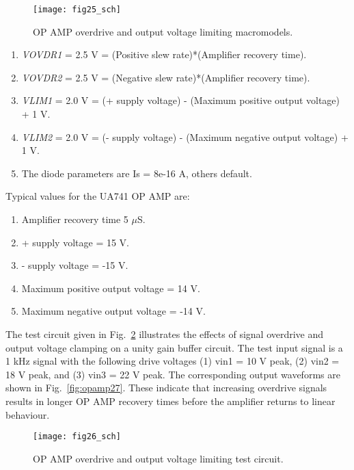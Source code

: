\begin{figure}
  \centering
  \texttt{[image: fig25\_sch]}
  \caption{OP AMP overdrive and output voltage limiting macromodels.}
  \label{fig:opamp25}
\end{figure}

\begin{enumerate}
\item \textit{VOVDR1} = 2.5 V = (Positive slew rate)*(Amplifier recovery time).
\item \textit{VOVDR2} = 2.5 V = (Negative slew rate)*(Amplifier recovery time).
\item \textit{VLIM1}  = 2.0 V = (+ supply voltage) - (Maximum positive output voltage) + 1 V.
\item \textit{VLIM2}  = 2.0 V = (- supply voltage) - (Maximum negative output voltage) + 1 V.
\item The diode parameters are Is = 8e-16 A, others default.
\end{enumerate}

Typical values for the UA741 OP AMP are:
\begin{enumerate}
\item Amplifier recovery time 5 $\mu$S.
\item + supply voltage =  15 V.
\item - supply voltage = -15 V.
\item Maximum positive output voltage =  14 V.
\item Maximum negative output voltage = -14 V.
\end{enumerate}

The test circuit given in Fig.~\ref{fig:opamp26} illustrates the effects of signal overdrive and output voltage clamping on a unity gain buffer circuit. The test input signal is a 1 kHz signal with the following drive voltages (1) vin1 = 10 V peak, (2) vin2 = 18 V peak, and (3) vin3 = 22 V peak. The corresponding output waveforms are shown in Fig.~\ref{fig:opamp27}. These indicate that increasing overdrive signals results in longer OP AMP recovery times before the amplifier returns to linear behaviour.
\begin{figure}
  \centering
  \texttt{[image: fig26\_sch]}
  \caption{OP AMP overdrive and output voltage limiting test circuit.}
  \label{fig:opamp26}
\end{figure}

